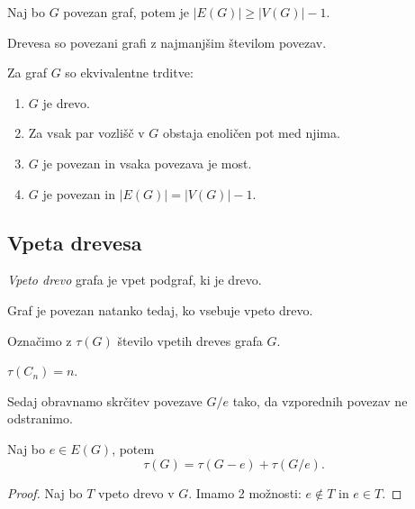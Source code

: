 \begin{lema}
    Naj bo $G$ povezan graf, potem je $|E(G)| \geq |V(G)| -1$.
\end{lema}

\begin{opomba}
    Drevesa so povezani grafi z najmanjšim številom povezav.
\end{opomba}

\begin{izrek}
    Za graf $G$ so ekvivalentne trditve:
    \begin{enumerate}
        \item $G$ je drevo.
        \item Za vsak par vozlišč v $G$ obstaja enoličen pot med njima.
        \item $G$ je povezan in vsaka povezava je most.
        \item $G$ je povezan in $|E(G)| = |V(G)|-1$.
    \end{enumerate}
\end{izrek}

\subsection{Vpeta drevesa}
\begin{definicija}
    \emph{Vpeto drevo} grafa je vpet podgraf, ki je drevo.
\end{definicija}

\begin{trditev}
    Graf je povezan natanko tedaj, ko vsebuje vpeto drevo.
\end{trditev}

Označimo z $\tau(G)$ število vpetih dreves grafa $G$.
\begin{primer}
    $\tau(C_n) = n$.
\end{primer}

\begin{opomba}
    Sedaj obravnamo skrčitev povezave $G/e$ tako, da vzporednih povezav ne odstranimo.
\end{opomba}

\begin{trditev}
    Naj bo $e \in E(G)$, potem $$\tau(G) = \tau(G-e) + \tau (G/e).$$
\end{trditev}

\begin{proof}
    Naj bo $T$ vpeto drevo v $G$. Imamo 2 možnosti: $e \notin T$ in $e \in T$.
\end{proof}

